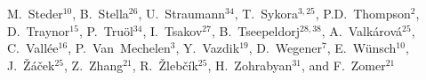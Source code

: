 \documentclass[12pt]{article}
\begin{document}
\begin{flushleft}
M.~Steder$^{10}$,              %
B.~Stella$^{26}$,              %
U.~Straumann$^{34}$,           %
T.~Sykora$^{3,25}$,            %
P.D.~Thompson$^{2}$,           %
D.~Traynor$^{15}$,             %
P.~Tru\"ol$^{34}$,             %
I.~Tsakov$^{27}$,              %
B.~Tseepeldorj$^{28,38}$,      %
A.~Valk\'arov\'a$^{25}$,       %
C.~Vall\'ee$^{16}$,            %
P.~Van~Mechelen$^{3}$,         %
Y.~Vazdik$^{19}$,              %
D.~Wegener$^{7}$,              %
E.~W\"unsch$^{10}$,            %
J.~\v{Z}\'a\v{c}ek$^{25}$,     %
Z.~Zhang$^{21}$,               %
R.~\v{Z}leb\v{c}\'{i}k$^{25}$, %
H.~Zohrabyan$^{31}$,           %
and
F.~Zomer$^{21}$                %



\end{flushleft}
\end{document}
